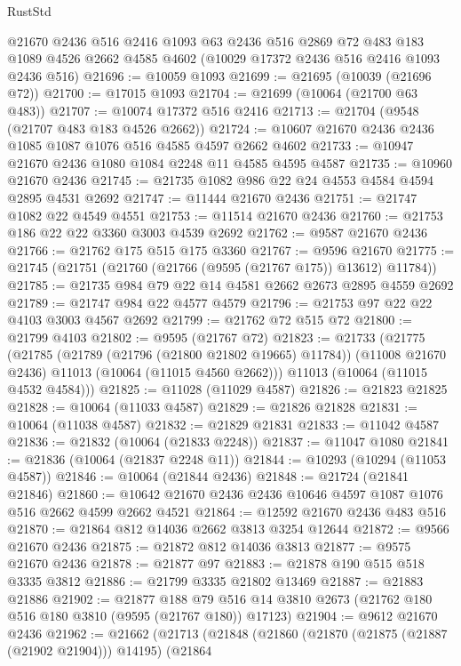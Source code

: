 \begin{lexlean}{RustStd}
\begin{coremodule}
    @21670
    @2436
    @516
    @2416
    @1093
    @63
    @2436
    @516
    @2869
    @72
    @483
    @183
    @1089
    @4526
    @2662
    @4585
    @4602
    (@10029 @17372 @2436 @516 @2416 @1093 @2436 @516)
@21696 := @10059 @1093
@21699 := @21695 (@10039 (@21696 @72))
@21700 := @17015 @1093
@21704 := @21699 (@10064 (@21700 @63 @483))
@21707 := @10074 @17372 @516 @2416
@21713 := @21704 (@9548 (@21707 @483 @183 @4526 @2662))
@21724 := @10607 @21670 @2436 @2436 @1085 @1087 @1076 @516 @4585 @4597 @2662 @4602
@21733 := @10947 @21670 @2436 @1080 @1084 @2248 @11 @4585 @4595 @4587
@21735 := @10960 @21670 @2436
@21745 := @21735 @1082 @986 @22 @24 @4553 @4584 @4594 @2895 @4531 @2692
@21747 := @11444 @21670 @2436
@21751 := @21747 @1082 @22 @4549 @4551
@21753 := @11514 @21670 @2436
@21760 := @21753 @186 @22 @22 @3360 @3003 @4539 @2692
@21762 := @9587 @21670 @2436
@21766 := @21762 @175 @515 @175 @3360
@21767 := @9596 @21670
@21775 := @21745 (@21751 (@21760 (@21766 (@9595 (@21767 @175)) @13612) @11784))
@21785 := @21735 @984 @79 @22 @14 @4581 @2662 @2673 @2895 @4559 @2692
@21789 := @21747 @984 @22 @4577 @4579
@21796 := @21753 @97 @22 @22 @4103 @3003 @4567 @2692
@21799 := @21762 @72 @515 @72
@21800 := @21799 @4103
@21802 := @9595 (@21767 @72)
@21823 := @21733
    (@21775
      (@21785
        (@21789 (@21796 (@21800 @21802 @19665) @11784))
        (@11008 @21670 @2436)
        @11013
        (@10064 (@11015 @4560 @2662)))
      @11013
      (@10064 (@11015 @4532 @4584)))
@21825 := @11028 (@11029 @4587)
@21826 := @21823 @21825
@21828 := @10064 (@11033 @4587)
@21829 := @21826 @21828
@21831 := @10064 (@11038 @4587)
@21832 := @21829 @21831
@21833 := @11042 @4587
@21836 := @21832 (@10064 (@21833 @2248))
@21837 := @11047 @1080
@21841 := @21836 (@10064 (@21837 @2248 @11))
@21844 := @10293 (@10294 (@11053 @4587))
@21846 := @10064 (@21844 @2436)
@21848 := @21724 (@21841 @21846)
@21860 := @10642 @21670 @2436 @2436 @10646 @4597 @1087 @1076 @516 @2662 @4599 @2662 @4521
@21864 := @12592 @21670 @2436 @483 @516
@21870 := @21864 @812 @14036 @2662 @3813 @3254 @12644
@21872 := @9566 @21670 @2436
@21875 := @21872 @812 @14036 @3813
@21877 := @9575 @21670 @2436
@21878 := @21877 @97
@21883 := @21878 @190 @515 @518 @3335 @3812
@21886 := @21799 @3335 @21802 @13469
@21887 := @21883 @21886
@21902 := @21877
    @188
    @79
    @516
    @14
    @3810
    @2673
    (@21762 @180 @516 @180 @3810 (@9595 (@21767 @180)) @17123)
@21904 := @9612 @21670 @2436
@21962 := @21662
    (@21713
      (@21848
        (@21860
          (@21870 (@21875 (@21887 (@21902 @21904))) @14195)
          (@21864

\end{coremodule}
\end{lexlean}
